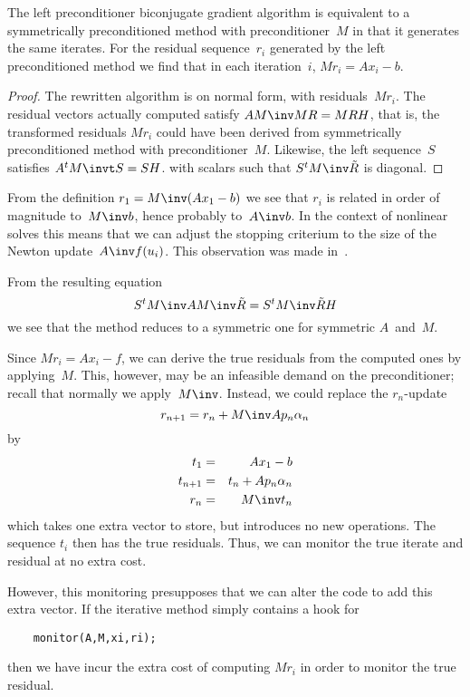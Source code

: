 \documentclass[11pt]{artikel3}
\begin{document}
\begin{Outline}
\begin{lemma}The left preconditioner biconjugate gradient algorithm
is equivalent to a symmetrically preconditioned method with preconditioner~$M$
in that it generates the same iterates.
For the  residual sequence~$r_i$ generated by the left preconditioned method
we find that in each iteration~$i$, $Mr_i=Ax_i-b$.
\end{lemma}
\begin{proof}
The rewritten algorithm is on normal form, with residuals~$Mr_i$.
The residual vectors actually computed satisfy $AM\inv MR=MRH$,
that is, the transformed residuals $Mr_i$ could have been derived
from symmetrically preconditioned method with preconditioner~$M$.
Likewise, the left sequence~$S$ satisfies $A^tM\invt S=SH$.
with scalars such that $S^tM\inv\tilde R$ is diagonal.
\end{proof}

\begin{remark}
From the definition $r_1=M\inv(Ax_1-b)$ we see that $r_i$ is related
in order of magnitude to~$M\inv b$, hence probably to~$A\inv b$. In
the context of nonlinear solves this means that we can adjust the
stopping criterium to the size of the Newton update~$A\inv f(u_i)$.
This observation was made in~\cite{ErnEtAl:polyalgorithmic-nonlinear}.
\end{remark}

From the resulting equation 
\[ S^tM\inv AM\inv\tilde R=S^tM\inv\tilde RH \]
we see that the method reduces to a symmetric one for symmetric
$A$~and~$M$.

Since $Mr_i=Ax_i-f$,
we can derive the true residuals from the computed ones
by applying~$M$.
This, however, may be an infeasible demand
on the preconditioner; recall that normally we apply~$M\inv$.
Instead, we could replace the $r_n$-update \[r_{n+1}=r_n+M\inv Ap_n\alpha_n\]
by 
\begin{eqnarray*} t_1&=&Ax_1-b\\ t_{n+1}&=&t_n+Ap_n\alpha_n\\
    r_n&=&M\inv t_n \end{eqnarray*}
which takes one extra vector to store, but introduces no new
operations. The sequence $t_i$ then has the true residuals.
Thus, we can monitor the true iterate and residual at no extra cost.

However, this monitoring presupposes that we can alter the code
to add this extra vector. If the iterative method simply contains
a hook for
\begin{verbatim}
    monitor(A,M,xi,ri);
\end{verbatim}
then we have incur the extra cost of computing $Mr_i$ in order to
monitor the true residual.


\end{Outline}
\end{document}
